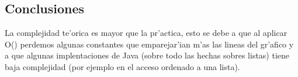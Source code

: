 \subsection{Conclusiones}
La complejidad te'orica es mayor que la pr'actica, esto se debe a que al aplicar O() perdemos algunas constantes que emparejar'ian m'as las lineas del gr'afico y a que algunas implentaciones de Java (sobre todo las hechas sobres listas) tiene baja complejidad (por ejemplo en el acceso ordenado a una lista).


